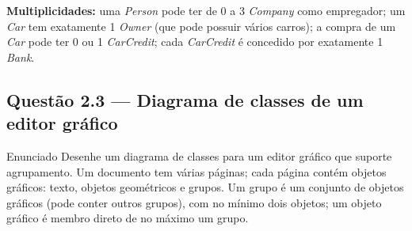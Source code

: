 \documentclass[11pt,a4paper]{article}
\begin{document}
\begin{resposta}
\textbf{Multiplicidades:} uma \textit{Person} pode ter de 0 a 3 \textit{Company}
como empregador; um \textit{Car} tem exatamente 1 \textit{Owner} (que pode possuir
vários carros); a compra de um \textit{Car} pode ter 0 ou 1 \textit{CarCredit};
cada \textit{CarCredit} é concedido por exatamente 1 \textit{Bank}.
\end{resposta}

\subsection*{Questão 2.3 — Diagrama de classes de um editor gráfico}
\begin{questao}{Enunciado}
Desenhe um diagrama de classes para um editor gráfico que suporte agrupamento.
Um documento tem várias páginas; cada página contém objetos gráficos: texto,
objetos geométricos e grupos. Um grupo é um conjunto de objetos gráficos (pode
conter outros grupos), com no mínimo dois objetos; um objeto gráfico é membro
direto de no máximo um grupo.
\end{questao}
\end{document}
